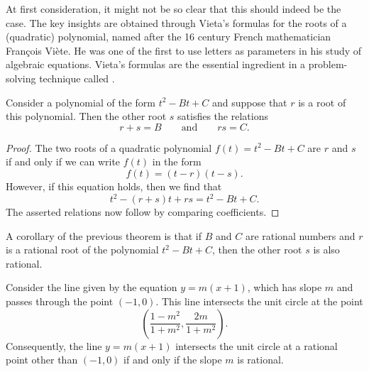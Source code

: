 At first consideration, it might not be so clear that this should indeed be the case. The key insights are obtained through Vieta's formulas for the roots of a (quadratic) polynomial, named after the 16\supth{} century French mathematician Fran\c{c}ois Vi\`{e}te. He was one of the first to use letters as parameters in his study of algebraic equations. Vieta's formulas are the essential ingredient in a problem-solving technique called .

\begin{theorem}\label{theorem:vieta-formulas-quadratic}
  Consider a polynomial of the form $t^2-Bt+C$ and suppose that $r$ is a root of this polynomial. Then the other root $s$ satisfies the relations
  \begin{equation*}
    r+s=B\qquad\text{and}\qquad rs=C.
  \end{equation*}
\end{theorem}

\begin{proof}
  The two roots of a quadratic polynomial $f(t)=t^2-Bt+C$ are $r$ and $s$ if and only if we can write $f(t)$ in the form
  \begin{equation*}
    f(t)=(t-r)(t-s).
  \end{equation*}
  However, if this equation holds, then we find that
  \begin{equation*}
    t^2-(r+s)t+rs=t^2-Bt+C.
  \end{equation*}
  The asserted relations now follow by comparing coefficients.
\end{proof}

A corollary of the previous theorem is that if $B$ and $C$ are rational numbers and $r$ is a rational root of the polynomial $t^2-Bt+C$, then the other root $s$ is also rational.

\begin{theorem}\label{theorem:stereographic-projection-unit-circle}
  Consider the line given by the equation $y=m(x+1)$, which has slope $m$ and passes through the point $(-1,0)$. This line intersects the unit circle at the point
  \begin{equation*}
    \left(\frac{1-m^2}{1+m^2},\frac{2m}{1+m^2}\right).
  \end{equation*}
  Consequently, the line $y=m(x+1)$ intersects the unit circle at a rational point other than $(-1,0)$ if and only if the slope $m$ is rational.
\end{theorem}

